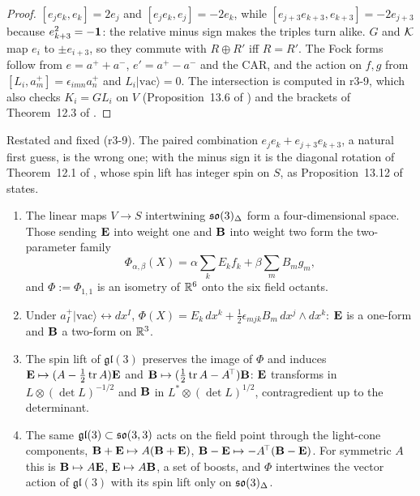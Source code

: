 \begin{proof}
$[e_je_k,e_k]=2e_j$ and $[e_je_k,e_j]=-2e_k$, while $[e_{j+3}e_{k+3},e_{k+3}]=-2e_{j+3}$ because $e_{k+3}^2=-\mathbf 1$: the relative minus sign makes the
triples turn alike. $G$ and $\mathcal K$ map $e_i$ to $\pm e_{i+3}$, so they commute with $R\oplus R'$ iff $R=R'$. The Fock forms follow from
$e=a^++a^-$, $e'=a^+-a^-$ and the CAR, and the action on $f,g$ from $[L_i,a^+_m]=\epsilon_{imn}a^+_n$ and $L_i|\mathrm{vac}\rangle=0$. The intersection is
computed in r3-9, which also checks $K_i=GL_i$ on $V$ (Proposition~13.6 of \cite{ES17}) and the brackets of Theorem~12.3 of \cite{ES17}.
\end{proof}

Restated and fixed (r3-9). The paired combination $e_je_k+e_{j+3}e_{k+3}$, a natural first guess, is the wrong one; with the minus sign it is the diagonal
rotation of Theorem~12.1 of \cite{ES17}, whose spin lift has integer spin on $S$, as Proposition~13.12 of \cite{ES17} states.

\begin{theorem}
\label{r3:thm:phi}
\begin{enumerate}[label=(\roman*),leftmargin=2.2em]
\item The linear maps $V\to S$ intertwining $\mathfrak{so}(3)_\Delta$ form a four-dimensional space. Those sending $\mathbf E$ into weight one and $\mathbf B$ into
weight two form the two-parameter family
\[
\Phi_{\alpha,\beta}(X)=\alpha\sum_kE_kf_k+\beta\sum_mB_mg_m ,
\]
and $\Phi:=\Phi_{1,1}$ is an isometry of $\mathbb{R}^6$ onto the six field octants.
\item Under $a^+_I|\mathrm{vac}\rangle\leftrightarrow dx^I$, $\Phi(X)=E_k\,dx^k+\tfrac12\epsilon_{mjk}B_m\,dx^j\wedge dx^k$: $\mathbf E$ is a one-form and $\mathbf B$ a two-form
on $\mathbb{R}^3$.
\item The spin lift of $\mathfrak{gl}(3)$ preserves the image of $\Phi$ and induces $\mathbf E\mapsto(A-\tfrac12\operatorname{tr} A)\mathbf E$ and $\mathbf B\mapsto(\tfrac12\operatorname{tr} A-A^{\!\top})\mathbf B$: $\mathbf E$
transforms in $L\otimes(\det L)^{-1/2}$ and $\mathbf B$ in $L^*\otimes(\det L)^{1/2}$, contragredient up to the determinant.
\item The same $\mathfrak{gl}(3)\subset\mathfrak{so}(3,3)$ acts on the field point through the light-cone components, $\mathbf B+\mathbf E\mapsto A(\mathbf B+\mathbf E)$,
$\mathbf B-\mathbf E\mapsto-A^{\!\top}(\mathbf B-\mathbf E)$. For symmetric $A$ this is $\mathbf B\mapsto A\mathbf E$, $\mathbf E\mapsto A\mathbf B$, a set of boosts, and $\Phi$ intertwines the
vector action of $\mathfrak{gl}(3)$ with its spin lift only on $\mathfrak{so}(3)_\Delta$.
\end{enumerate}
\end{theorem}

